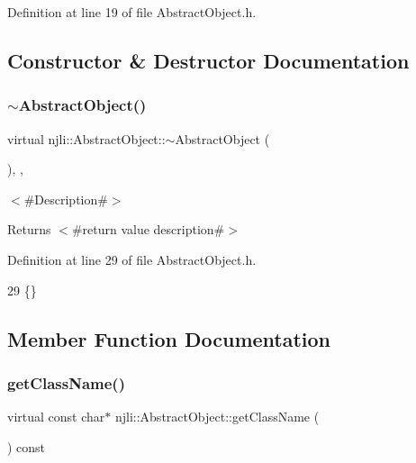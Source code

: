 Definition at line 19 of file Abstract\+Object.\+h.



\subsection{Constructor \& Destructor Documentation}
\mbox{\label{classnjli_1_1_abstract_object_aadfc508440196d05461ebf48fd3d3625}} 
\subsubsection{\texorpdfstring{$\sim$\+Abstract\+Object()}{~AbstractObject()}}
{\footnotesize\ttfamily virtual njli\+::\+Abstract\+Object\+::$\sim$\+Abstract\+Object (\begin{DoxyParamCaption}{ }\end{DoxyParamCaption})\hspace{0.3cm}{\ttfamily [inline]}, {\ttfamily [protected]}, {\ttfamily [virtual]}}

$<$\#\+Description\#$>$

\begin{DoxyReturn}{Returns}
$<$\#return value description\#$>$ 
\end{DoxyReturn}


Definition at line 29 of file Abstract\+Object.\+h.


\begin{DoxyCode}
29 \{\}
\end{DoxyCode}


\subsection{Member Function Documentation}
\mbox{\label{classnjli_1_1_abstract_object_afdabb48c4bf763e297ffe810b433a863}} 
\subsubsection{\texorpdfstring{get\+Class\+Name()}{getClassName()}}
{\footnotesize\ttfamily virtual const char$\ast$ njli\+::\+Abstract\+Object\+::get\+Class\+Name (\begin{DoxyParamCaption}{ }\end{DoxyParamCaption}) const\hspace{0.3cm}{\ttfamily [pure virtual]}}

